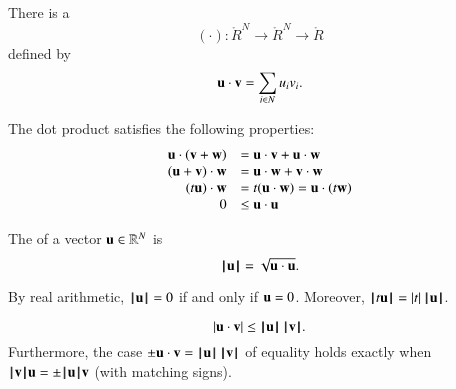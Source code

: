 \begin{definition}
\label{def:dot}
There is a 
\begin{displaymath}
(\cdot):\ring{R}^N\to\ring{R}^N\to\ring{R}
\end{displaymath}
defined by
\begin{displaymath}
\u\cdot \v = \sum_{i\in N} u_i v_i.
\end{displaymath}
%
%
\end{definition}


The dot product satisfies the following
properties:
\begin{equation}\label{eqn:dot}
\begin{array}{rll}
\u \cdot (\v + \w) &= \u \cdot \v + \u \cdot \w\\
(\u + \v)\cdot \w &= \u \cdot \w + \v \cdot \w\\
(t \u)\cdot \w &= t(\u \cdot \w) = \u \cdot (t \w)\\
0 &\le \u\cdot \u\\
\end{array}
\end{equation}

\begin{definition}[norm]
\label{def:norm}
The  of a vector $\u\in\ring{R}^N$ is
\begin{displaymath}\normo{\u} = \sqrt{\u\cdot \u}.\end{displaymath}
%
\end{definition}

By  real arithmetic,
$\normo{\u}=0$  if and only if $\u=0$.  Moreover,
$\normo{ t \u } = |t| \, \normo{\u}$.   



\begin{lemma}
  \begin{displaymath}|\u \cdot \v| \le
    \normo{\u}\,\normo{\v}.\end{displaymath} Furthermore, the case
  $\pm \u\cdot \v = \normo{\u}\,\normo{\v}$ of equality holds exactly
  when $\normo{\v} \u = \pm\normo{\u} \v$ (with matching signs).
\end{lemma}
%

